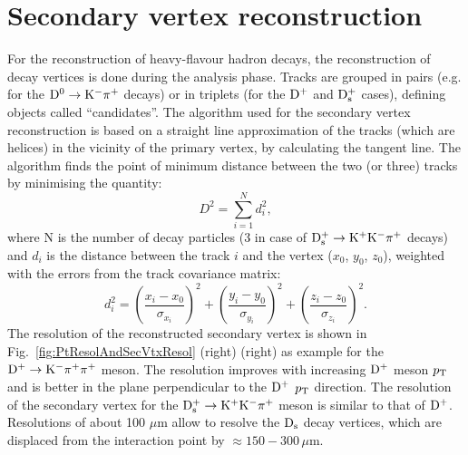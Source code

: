 \section{Secondary vertex reconstruction}
\label{sec:secVertex}
For the reconstruction of heavy-flavour hadron decays, the reconstruction of decay vertices 
is done during the analysis phase. Tracks are grouped in pairs (e.g. for the ${\rm D^0\to K^-\pi^+}$ decays) or in triplets (for the ${\rm D^+}$ and ${\rm D_s^+}$ cases), 
defining objects called ``candidates''. 
The algorithm used for the secondary vertex reconstruction is based on a straight 
line approximation of the tracks (which are helices) in the vicinity of the primary vertex, by calculating the tangent line.
The algorithm finds the point of minimum distance between the two (or three) tracks by minimising the quantity:
\begin{equation}
D^2= \sum_{i=1}^N d_i^2,
\end{equation}
where N is the number of decay particles (3 in case of ${\rm D^{+}_\mathrm{s}\to K^+ K^-\pi^+}$ decays) and $d_i$ is the distance between the track $i$ and the vertex 
($x_0$, $y_0$, $z_0$), weighted with the errors from the track covariance matrix:
\begin{equation}
d^2_i=\left(\frac{x_i-x_0}{\sigma_{x_i}}\right)^2+
\left(\frac{y_i-y_0}{\sigma_{y_i}}\right)^2+\left(\frac{z_i-z_0}{\sigma_{z_i}}\right)^2.
\end{equation}
The resolution of the reconstructed secondary vertex is shown in Fig.~\ref{fig:PtResolAndSecVtxResol} (right) 
(right) as example for the ${\rm D}^+\to {\rm K}^-\pi^+\pi^+$ meson. The 
resolution improves with increasing ${\rm D^+}$ meson $p_{\rm T}$ and is better in the plane perpendicular to the ${\rm D^+}$ $p_{\rm T}$ direction.
The resolution of the secondary vertex for the ${\rm D^{+}_\mathrm{s}\to K^+ K^-\pi^+}$ meson is similar to that of ${\rm D^+}$.
Resolutions of about 100 $\mu$m allow to resolve the ${\rm D_s}$ decay vertices, which are
displaced from the interaction point by $\approx 150-300\,\mu$m.


